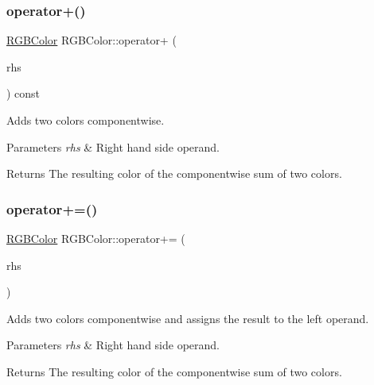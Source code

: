 \subsubsection{\texorpdfstring{operator+()}{operator+()}}
{\footnotesize\ttfamily \hyperlink{class_r_g_b_color}{R\+G\+B\+Color} R\+G\+B\+Color\+::operator+ (\begin{DoxyParamCaption}\item[{const \hyperlink{class_r_g_b_color}{R\+G\+B\+Color} \&}]{rhs }\end{DoxyParamCaption}) const\hspace{0.3cm}{\ttfamily [inline]}}

Adds two colors componentwise. 
\begin{DoxyParams}{Parameters}
{\em rhs} & Right hand side operand. \\
\hline
\end{DoxyParams}
\begin{DoxyReturn}{Returns}
The resulting color of the componentwise sum of two colors. 
\end{DoxyReturn}
\hypertarget{group___utilities_ga985586cc676498527d1597ab3beee728}{}\label{group___utilities_ga985586cc676498527d1597ab3beee728} 
\subsubsection{\texorpdfstring{operator+=()}{operator+=()}}
{\footnotesize\ttfamily \hyperlink{class_r_g_b_color}{R\+G\+B\+Color} R\+G\+B\+Color\+::operator+= (\begin{DoxyParamCaption}\item[{const \hyperlink{class_r_g_b_color}{R\+G\+B\+Color} \&}]{rhs }\end{DoxyParamCaption})\hspace{0.3cm}{\ttfamily [inline]}}

Adds two colors componentwise and assigns the result to the left operand. 
\begin{DoxyParams}{Parameters}
{\em rhs} & Right hand side operand. \\
\hline
\end{DoxyParams}
\begin{DoxyReturn}{Returns}
The resulting color of the componentwise sum of two colors. 
\end{DoxyReturn}
\hypertarget{group___utilities_ga2d0a70444ca0c882f3a5dbed42787ef8}{}\label{group___utilities_ga2d0a70444ca0c882f3a5dbed42787ef8} 
